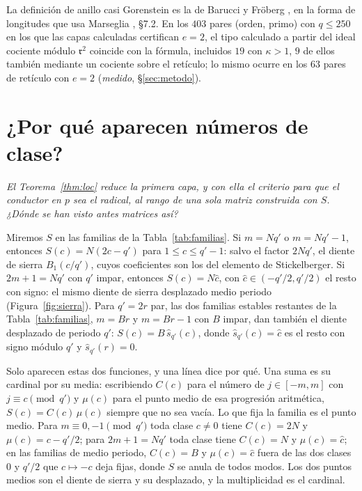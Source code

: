\documentclass[11pt,a4paper]{article}
\theoremstyle{definition}
\newcommand{\rad}{\mathfrak{r}}
\newcommand{\pregunta}[1]{\par\smallskip\noindent\emph{#1}\par\smallskip}
\begin{document}
\noindent La definición de anillo casi Gorenstein es la de Barucci y Fröberg \cite{BF97}, en la forma de longitudes
que usa Marseglia \cite{Mars24}, \S7.2. En los $403$ pares (orden, primo) con $q\le250$ en los que las capas
calculadas certifican $e=2$, el tipo calculado a partir del ideal cociente módulo $\rad^2$ coincide con la fórmula,
incluidos $19$ con $\kappa>1$, $9$ de ellos también mediante un cociente sobre el retículo; lo mismo ocurre en los $63$
pares de retículo con $e=2$ (\emph{medido}, \S\ref{sec:metodo}).

\section{¿Por qué aparecen números de clase?}\label{sec:clase}

\pregunta{El Teorema~\ref{thm:loc} reduce la primera capa, y con ella el criterio para que el conductor en $p$ sea
el radical, al rango de una sola matriz construida con $S$.
¿Dónde se han visto antes matrices así?}

\noindent Miremos $S$ en las familias de la Tabla~\ref{tab:familias}. Si $m=Nq'$ o $m=Nq'-1$, entonces
$S(c)=N(2c-q')$ para $1\le c\le q'-1$: salvo el factor $2Nq'$, el diente de sierra $B_1(c/q')$, cuyos coeficientes
son los del elemento de Stickelberger. Si $2m+1=Nq'$ con $q'$ impar, entonces $S(c)=N\hat c$, con
$\hat c\in(-q'/2,q'/2)$ el resto con signo: el mismo diente de sierra desplazado medio periodo
(Figura~\ref{fig:sierra}). Para $q'=2r$ par, las dos familias estables restantes de la
Tabla~\ref{tab:familias}, $m=Br$ y $m=Br-1$ con $B$ impar, dan también el diente desplazado de periodo $q'$:
$S(c)=B\,\hat s_{q'}(c)$, donde $\hat s_{q'}(c)=\hat c$ es el resto con signo módulo $q'$ y $\hat s_{q'}(r)=0$.

\noindent Solo aparecen estas dos funciones, y una línea dice por qué. Una suma es su cardinal por su media:
escribiendo $C(c)$ para el número de $j\in[-m,m]$ con $j\equiv c\pmod{q'}$ y $\mu(c)$ para el punto medio de esa
progresión aritmética, $S(c)=C(c)\,\mu(c)$ siempre que no sea vacía. Lo que fija la familia es el punto medio. Para
$m\equiv0,-1\pmod{q'}$ toda clase $c\neq0$ tiene $C(c)=2N$ y $\mu(c)=c-q'/2$; para $2m+1=Nq'$ toda
clase tiene $C(c)=N$ y $\mu(c)=\hat c$; en las familias de medio periodo, $C(c)=B$ y $\mu(c)=\hat c$ fuera de las
dos clases $0$ y $q'/2$ que $c\mapsto-c$ deja fijas, donde $S$ se anula de todos modos. Los dos puntos medios son
el diente de sierra y su desplazado, y la multiplicidad es el cardinal.
\end{document}
